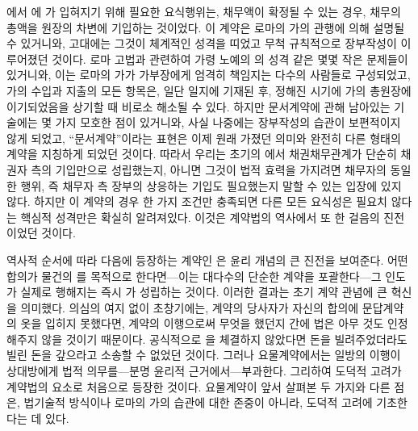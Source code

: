 에서 에 가 입혀지기 위해 필요한
요식행위는,
채무액이 확정될 수 있는 경우,
채무의 총액을
원장의 차변에 기입하는 것이었다.
이 계약은 로마의 가의 관행에 의해 설명될 수 있거니와,
고대에는 그것이 체계적인 성격을 띠었고 무척 규칙적으로 장부작성이
이루어졌던 것이다.
로마 고법과 관련하여
가령 노예의 의 성격 같은
몇몇 작은 문제들이 있거니와,
이는
로마의 가가 가부장에게 엄격히 책임지는 다수의 사람들로
구성되었고,
가의 수입과 지출의 모든 항목은,
일단 일지에 기재된 후,
정해진 시기에
가의 총원장에 이기되었음을 상기할 때
비로소 해소될 수 있다.
하지만 문서계약에 관해 남아있는 기술에는
몇 가지 모호한 점이 있거니와,
사실
나중에는
장부작성의 습관이
보편적이지 않게 되었고,
``문서계약''이라는 표현은 이제 원래 가졌던 의미와 완전히
다른 형태의 계약을 지칭하게 되었던 것이다.
따라서 우리는
초기의 에서
채권채무관계가 단순히 채권자 측의 기입만으로 성립했는지,
아니면
그것이 법적 효력을 가지려면
채무자의 동일한 행위, 즉 채무자 측 장부의 상응하는 기입도 필요했는지
말할 수 있는 입장에 있지 않다.
하지만
이 계약의 경우
한 가지 조건만 충족되면 다른 모든 요식성은 필요치 않다는
핵심적 성격만은 확실히 알려져있다.
이것은 계약법의 역사에서 또 한 걸음의 진전이었던 것이다.

역사적 순서에 따라 다음에 등장하는 계약인 은
윤리 개념의 큰 진전을 보여준다.
어떤 합의가 물건의 를 목적으로 한다면---이는
대다수의 단순한 계약을 포괄한다---그 인도가 실제로 행해지는 즉시
가 성립하는 것이다.
이러한 결과는 초기 계약 관념에 큰 혁신을 의미했다.
의심의 여지 없이 초창기에는,
계약의 당사자가 자신의 합의에 문답계약의 옷을 입히지 못했다면,
계약의 이행으로써 무엇을 했던지 간에
법은 아무 것도 인정해주지 않을 것이기 때문이다.
공식적으로 을 체결하지 않았다면
돈을 빌려주었더라도 빌린 돈을 갚으라고 소송할 수 없었던 것이다.
그러나 요물계약에서는
일방의 이행이 상대방에게 법적 의무를---분명 윤리적 근거에서---부과한다.
그리하여 도덕적 고려가 계약법의 요소로 처음으로 등장한 것이다.
요물계약이
앞서 살펴본 두 가지와 다른 점은,
법기술적 방식이나 로마의 가의 습관에 대한 존중이 아니라,
도덕적 고려에 기초한다는 데 있다.


